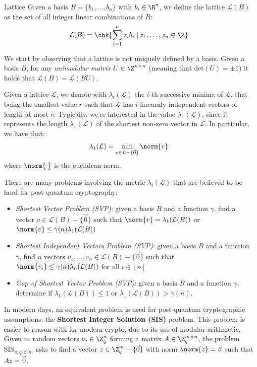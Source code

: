 \documentclass[a4paper, 12pt]{report}
\begin{document}
    \begin{frameddefn}{Lattice}
        Given a basis $B = \{b_1, \ldots, b_n\}$ with $b_i \in \R^n$, we define the lattice $\mathcal{L}(B)$ as the set of all integer linear combinations of $B$:
        \[\mathcal{L}(B) = \cbk{\sum_{i = 1}^{n} z_i b_i \mid z_1, \ldots, z_n \in \Z}\]
    \end{frameddefn}

    We start by observing that a lattice is not uniquely defined by a basis. Given a basis $B$, for any \textit{unimodular matrix} $U \in \Z^{n \times n}$ (meaning that $\mathrm{det}(U) = \pm 1$) it holds that $\mathcal{L}(B) = \mathcal{L}(BU)$.
    
    Given a lattice $\mathcal{L}$, we denote with $\lambda_i(\mathcal{L})$ the $i$-th successive minima of $\mathcal{L}$, that being the smallest value $r$ such that $\mathcal{L}$ has $i$ linearnly independent vectors of length at most $r$. Typically, we're interested in the value $\lambda_1(\mathcal{L})$,  since it represents the length $\lambda_1(\mathcal{L})$ of the shortest non-zero vector in $\mathcal{L}$. In particular, we have that:
    \[\lambda_1(\mathcal{L}) = \min_{v \in \mathcal{L} - \{\vec 0\}} \norm{v}\]
    where $\norm{\cdot}$ is the euclidean-norm.

    There are many problems involving the metric $\lambda_i(\mathcal{L})$ that are believed to be hard for post-quantum cryptography:
    \begin{itemize}
        \item \textit{Shortest Vector Problem (SVP)}: given a basis $B$ and a function $\gamma$, find a vector $v \in \mathcal{L}(B)-\{\vec 0\}$ such that $\norm{v} = \lambda_1(\mathcal{L}(B))$ or $\norm{v} \leq \gamma(n) \lambda_1(\mathcal{L}(B))$
        \item \textit{Shortest Independent Vectors Problem (SVP)}: given a basis $B$ and a function $\gamma$, find $n$ vectors $v_1, \ldots, v_n \in \mathcal{L}(B)-\{\vec 0\}$ such that $\norm{v_i} \leq \gamma(n) \lambda_n(\mathcal{L}(B))$ for all $i \in [n]$
        \item \textit{Gap of Shortest Vector Problem (SVP)}: given a basis $B$ and a function $\gamma$, determine if $\lambda_1(\mathcal{L}(B)) \leq 1$ or $\lambda_1(\mathcal{L}(B)) > \gamma(n)$.
    \end{itemize}

    In modern days, an equivalent problem is used for post-quantum cryptographic assumptions: the \textbf{Shortest Integer Solution (SIS)} problem. This problem is easier to reason with for modern crypto, due to its use of modular arithmetic. Given $m$ random vectors $a_i \in \Z_q^n$ forming a matrix $A \in \Z_q^{m \times n}$, the problem $\mathrm{SIS}_{n,q,\beta,m}$ asks to find a vector $z \in \Z_q^m-\{\vec 0\}$ with norm $\norm{z} = \beta$ such that $Az = \vec 0$.
\end{document}
